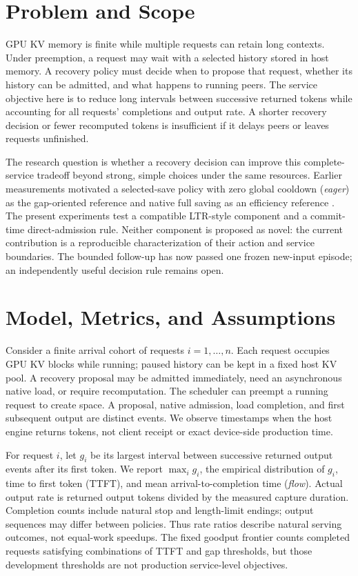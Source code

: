 \documentclass[10pt]{article}
\begin{document}
\section{Problem and Scope}
GPU KV memory is finite while multiple requests can retain long contexts. Under preemption, a request may wait with a selected history stored in host memory. A recovery policy must decide when to propose that request, whether its history can be admitted, and what happens to running peers. The service objective here is to reduce long intervals between successive returned tokens while accounting for all requests' completions and output rate. A shorter recovery decision or fewer recomputed tokens is insufficient if it delays peers or leaves requests unfinished.

The research question is whether a recovery decision can improve this complete-service tradeoff beyond strong, simple choices under the same resources. Earlier measurements motivated a selected-save policy with zero global cooldown (\emph{eager}) as the gap-oriented reference and native full saving as an efficiency reference \cite{argument}. The present experiments test a compatible LTR-style component and a commit-time direct-admission rule. Neither component is proposed as novel: the current contribution is a reproducible characterization of their action and service boundaries. The bounded follow-up has now passed one frozen new-input episode; an independently useful decision rule remains open.

\section{Model, Metrics, and Assumptions}
Consider a finite arrival cohort of requests $i=1,\ldots,n$. Each request occupies GPU KV blocks while running; paused history can be kept in a fixed host KV pool. A recovery proposal may be admitted immediately, need an asynchronous native load, or require recomputation. The scheduler can preempt a running request to create space. A proposal, native admission, load completion, and first subsequent output are distinct events. We observe timestamps when the host engine returns tokens, not client receipt or exact device-side production time.

For request $i$, let $g_i$ be its largest interval between successive returned output events after its first token. We report $\max_i g_i$, the empirical distribution of $g_i$, time to first token (TTFT), and mean arrival-to-completion time (\emph{flow}). Actual output rate is returned output tokens divided by the measured capture duration. Completion counts include natural stop and length-limit endings; output sequences may differ between policies. Thus rate ratios describe natural serving outcomes, not equal-work speedups. The fixed goodput frontier counts completed requests satisfying combinations of TTFT and gap thresholds, but those development thresholds are not production service-level objectives.
\end{document}
